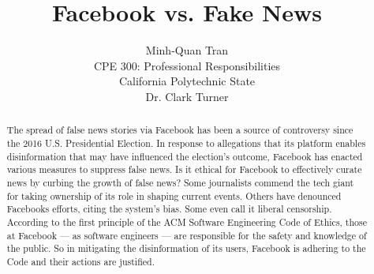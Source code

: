 


\title{\vfill Facebook vs. Fake News\\
\vspace{8pt}
\normalsize{}
}

\author{Minh-Quan Tran\\
\normalsize{CPE 300: Professional Responsibilities}\\
\normalsize{California Polytechnic State}\\
\normalsize{Dr. Clark Turner}
}

\maketitle


\vfill

\begin{abstract}
The spread of false news stories via Facebook has been a source of controversy since the 2016 U.S. Presidential Election. \cite{telegraph_fake_news} In response to allegations that its platform enables disinformation that may have influenced the election's outcome, \cite{tc_snowden_fb,stanford_fake_news_study} Facebook has enacted various measures to suppress false news. \cite{fb_reduce_clickbait,fb_addressing_hoaxes,fb_spot_fake_news} Is it ethical for Facebook to effectively curate news by curbing the growth of false news? Some journalists commend the tech giant for taking ownership of its role in shaping current events. \cite{cnn_fight} Others have denounced Facebooks efforts, citing the system's bias. \cite{vox_sentences_fn} Some even call it liberal censorship. \cite{milo_censor} According to the first principle of the ACM Software Engineering Code of Ethics, those at Facebook --- as software engineers --- are responsible for the safety and knowledge of the public. \cite{se_code} So in mitigating the disinformation of its users, Facebook is adhering to the Code and their actions are justified.
\end{abstract}

\thispagestyle{empty} 
\pagebreak